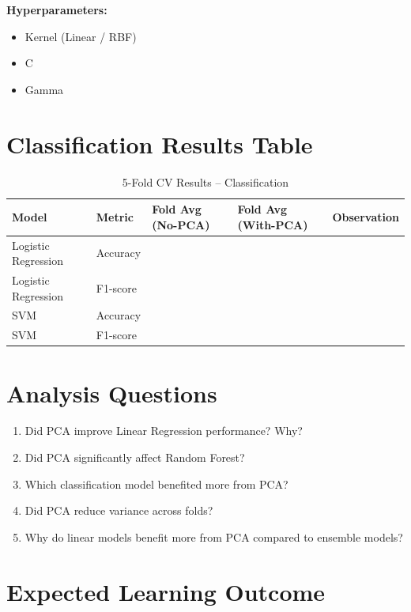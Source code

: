 \documentclass[11pt]{article}
\begin{document}
\textbf{Hyperparameters:}
\begin{itemize}
    \item Kernel (Linear / RBF)
    \item C
    \item Gamma
\end{itemize}

\section*{Classification Results Table}

\begin{table}[h!]
\centering
\caption{5-Fold CV Results – Classification}
\begin{tabularx}{\textwidth}{|X|X|X|X|X|}
\hline
Model & Metric & Fold Avg (No-PCA) & Fold Avg (With-PCA) & Observation \\
\hline
Logistic Regression & Accuracy &  &  &  \\
Logistic Regression & F1-score &  &  &  \\
SVM & Accuracy &  &  &  \\
SVM & F1-score &  &  &  \\
\hline
\end{tabularx}
\end{table}

\section*{Analysis Questions}

\begin{enumerate}
    \item Did PCA improve Linear Regression performance? Why?
    \item Did PCA significantly affect Random Forest?
    \item Which classification model benefited more from PCA?
    \item Did PCA reduce variance across folds?
    \item Why do linear models benefit more from PCA compared to ensemble models?
\end{enumerate}

\section*{Expected Learning Outcome}
\end{document}
